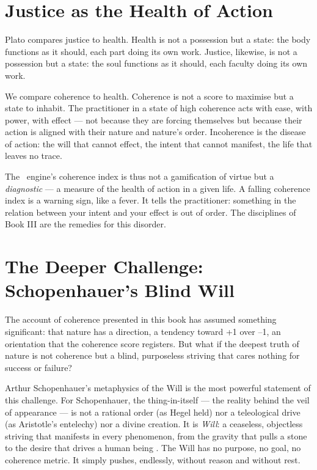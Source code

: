 \section{Justice as the Health of Action}

Plato compares justice to health. Health is not a possession but a state: the
body functions as it should, each part doing its own work. Justice, likewise,
is not a possession but a state: the soul functions as it should, each faculty
doing its own work.

We compare coherence to health. Coherence is not a score to maximise but a
state to inhabit. The practitioner in a state of high coherence acts with ease,
with power, with effect --- not because they are forcing themselves but because
their action is aligned with their nature and nature's order. Incoherence is
the disease of action: the will that cannot effect, the intent that cannot
manifest, the life that leaves no trace.

The \physis\ engine's coherence index is thus not a gamification of virtue but
a \emph{diagnostic} --- a measure of the health of action in a given life. A
falling coherence index is a warning sign, like a fever. It tells the practitioner:
something in the relation between your intent and your effect is out of order.
The disciplines of Book III are the remedies for this disorder.

\section{The Deeper Challenge: Schopenhauer's Blind Will}

The account of coherence presented in this book has assumed something significant:
that nature has a direction, a tendency toward +1 over --1, an orientation that
the coherence score registers. But what if the deepest truth of nature is not
coherence but a blind, purposeless striving that cares nothing for success or
failure?

Arthur Schopenhauer's metaphysics of the Will is the most powerful statement of
this challenge. For Schopenhauer, the thing-in-itself --- the reality behind the
veil of appearance --- is not a rational order (as Hegel held) nor a teleological
drive (as Aristotle's entelechy) nor a divine creation. It is \emph{Will}:
a ceaseless, objectless striving that manifests in every phenomenon, from the
gravity that pulls a stone to the desire that drives a human being
\parencite{schopenhauer1818will}. The Will has no purpose, no goal, no
coherence metric. It simply pushes, endlessly, without reason and without rest.

